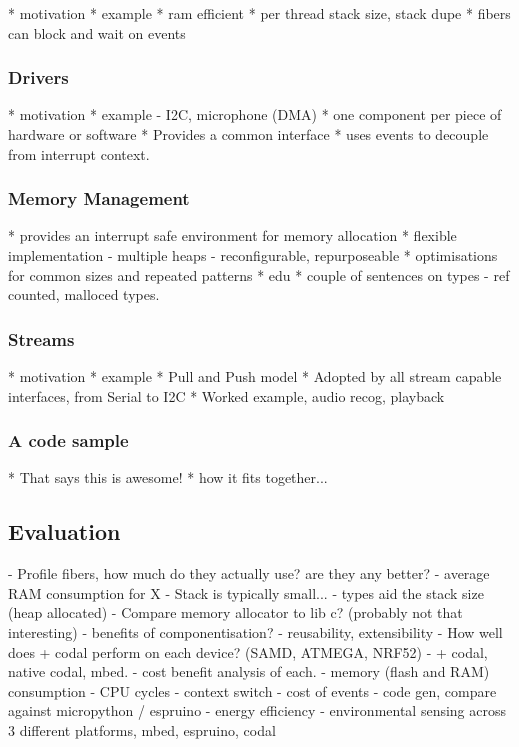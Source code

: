 * motivation
* example
* ram efficient
* per thread stack size, stack dupe
* fibers can block and wait on events

\subsubsection{Drivers}

* motivation
* example - I2C, microphone (DMA)
* one component per piece of hardware or software
* Provides a common interface
* uses events to decouple from interrupt context.

\subsubsection{Memory Management}

* provides an interrupt safe environment for memory allocation
* flexible implementation
    - multiple heaps
    - reconfigurable, repurposeable
* optimisations for common sizes and repeated patterns
* edu
* couple of sentences on types
    - ref counted, malloced types.

\subsubsection{Streams}

* motivation
* example
* Pull and Push model
* Adopted by all stream capable interfaces, from Serial to I2C
* Worked example, audio recog, playback

\subsubsection{A code sample}

* That says this is awesome!
* how it fits together...

\subsection{Evaluation}

- Profile fibers, how much do they actually use? are they any better?
    - average RAM consumption for X
    - Stack is typically small...
    - types aid the stack size (heap allocated)
- Compare memory allocator to lib c? (probably not that interesting)
- benefits of componentisation?
    - reusability, extensibility
- How well does \MC + codal perform on each device? (SAMD, ATMEGA, NRF52)
    - \MC + codal, native codal, mbed.
    - cost benefit analysis of each.
    - memory (flash and RAM) consumption
    - CPU cycles
        - context switch
        - cost of events
        - code gen, compare against micropython / espruino
    - energy efficiency
        - environmental sensing across 3 different platforms, mbed, espruino, codal